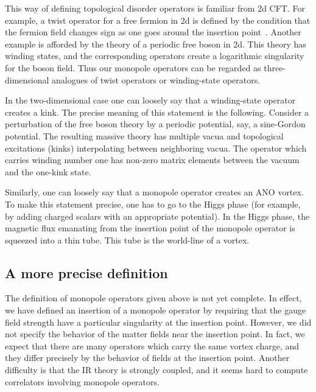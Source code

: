 \documentclass[a4paper,12pt, amsfonts, amssymb]{article}
\begin{document}
This way of defining topological
disorder operators is familiar from 2d CFT. For example, a twist
operator for a free fermion in 2d is defined by the condition that the
fermion field changes sign as one goes around the insertion 
point~\cite{Ginsparg}.
Another example is afforded by the theory of a periodic free boson in 2d.
This theory has winding states, and the corresponding operators
create a logarithmic singularity for the boson field.  
Thus our monopole operators can be regarded as three-dimensional analogues
of twist operators or winding-state operators.

In the two-dimensional case one can loosely say that a winding-state
operator creates a kink. The precise meaning of this statement is the
following. Consider a perturbation of the free boson theory by
a periodic potential, say, a sine-Gordon potential. The resulting
massive theory has multiple vacua and topological excitations (kinks) interpolating between neighboring vacua. The operator which carries
winding number one has non-zero matrix elements between the vacuum
and the one-kink state.

Similarly, one can loosely say that a monopole operator creates
an ANO vortex. To make this statement precise, one
has to go to the Higgs phase (for example, by adding charged scalars
with an appropriate potential). In the Higgs phase, the magnetic
flux emanating from the insertion point of the monopole operator
is squeezed into a thin tube. This tube is the world-line of a vortex.

\subsection{A more precise definition}

The definition of monopole operators given above is not yet complete.
In effect, we have defined an insertion of a monopole operator by 
requiring that the gauge field strength have a particular singularity
at the insertion point. However, we did not specify the behavior
of the matter fields near the insertion point. In fact, we expect
that there are many operators which carry the same vortex charge, and
they differ precisely by the behavior of fields at the insertion point. 
Another difficulty is that the IR theory is strongly coupled, and it seems
hard to compute correlators involving monopole operators.
\end{document}
